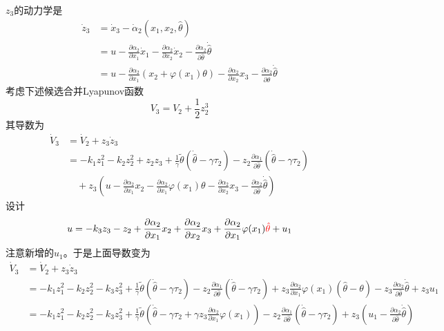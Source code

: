 
$z_3$的动力学是
\begin{align*}
    \dot{z}_3&=\dot{x}_3-\dot{\alpha}_2(x_1,x_2,\hat{\theta})\\
    &=u-\frac{\partial\alpha_2}{\partial x_1}\dot{x}_1-\frac{\partial\alpha_2}{\partial x_2}\dot{x}_2 - \frac{\partial\alpha_2}{\partial \hat{\theta}}\dot{\hat{\theta}}\\
    &=u-\frac{\partial\alpha_2}{\partial x_1}(x_2+\varphi(x_1)\theta)-\frac{\partial\alpha_2}{\partial x_2}x_3 - \frac{\partial\alpha_2}{\partial \hat{\theta}}\dot{\hat{\theta}}
\end{align*}
考虑下述候选合并Lyapunov函数
\[ V_3 = V_2 + \frac{1}{2} z^3_2 \]
其导数为
\begin{align*}
    \dot{V}_3&=\dot{V}_2+z_3\dot{z}_3\\
    &=-k_1z_1^2-k_2z_2^2+z_2z_3+\frac{1}{\gamma}\tilde{\theta}(\dot{\hat{\theta}}-\gamma \tau_2)-z_2\frac{\partial
  \alpha_1}{\partial \hat{\theta} }(\dot{\hat{\theta}}-\gamma\tau_2)\\
  &\quad +z_3\left(u-\frac{\partial\alpha_2}{\partial x_1}x_2-\frac{\partial\alpha_2}{\partial x_1}\varphi(x_1)\theta-\frac{\partial\alpha_2}{\partial x_2}x_3 - \frac{\partial\alpha_2}{\partial \hat{\theta}}\dot{\hat{\theta}}\right)
\end{align*}
设计
\[u=-k_3z_3-z_2+\frac{\partial\alpha_2}{\partial x_1}x_2+\frac{\partial\alpha_2}{\partial x_2}x_3+\frac{\partial\alpha_2}{\partial x_1}\varphi(x_1)\textcolor{red}{\hat\theta}+u_1\]
注意新增的$u_1$。于是上面导数变为
\begin{align*}
    \dot{V}_3&=\dot{V}_2+z_3\dot{z}_3\\
    &=-k_1z_1^2-k_2z_2^2-k_3z_3^2+\frac{1}{\gamma}\tilde{\theta}(\dot{\hat{\theta}}-\gamma \tau_2)-z_2\frac{\partial
  \alpha_1}{\partial \hat{\theta} }(\dot{\hat{\theta}}-\gamma\tau_2) +z_3\frac{\partial\alpha_2}{\partial x_1}\varphi(x_1)(\hat{\theta}-\theta)- z_3\frac{\partial\alpha_2}{\partial \hat{\theta}}\dot{\hat{\theta}}+z_3u_1\\
  &=-k_1z_1^2-k_2z_2^2-k_3z_3^2+\frac{1}{\gamma}\tilde{\theta}\left(\dot{\hat{\theta}}-\gamma \tau_2+\gamma z_3\frac{\partial\alpha_2}{\partial x_1}\varphi(x_1)\right)-z_2\frac{\partial
  \alpha_1}{\partial \hat{\theta} }(\dot{\hat{\theta}}-\gamma\tau_2) +z_3\left(u_1- \frac{\partial\alpha_2}{\partial \hat{\theta}}\dot{\hat{\theta}}\right)
\end{align*}

